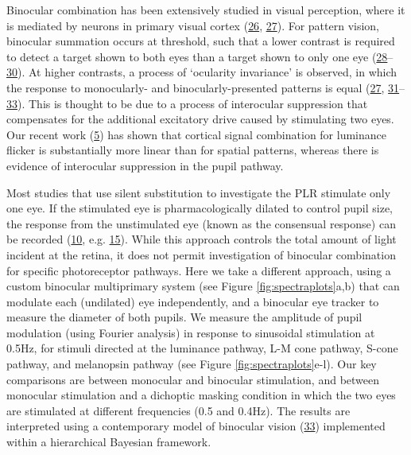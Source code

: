 \documentclass[
]{article}
\begin{document}
Binocular combination has been extensively studied in visual perception, where it is mediated by neurons in primary visual cortex (\protect\hyperlink{ref-Hubel1962}{26}, \protect\hyperlink{ref-Moradi2009}{27}). For pattern vision, binocular summation occurs at threshold, such that a lower contrast is required to detect a target shown to both eyes than a target shown to only one eye (\protect\hyperlink{ref-Baker2018}{28}--\protect\hyperlink{ref-Legge1984}{30}). At higher contrasts, a process of `ocularity invariance' is observed, in which the response to monocularly- and binocularly-presented patterns is equal (\protect\hyperlink{ref-Moradi2009}{27}, \protect\hyperlink{ref-Baker2007}{31}--\protect\hyperlink{ref-Meese2006}{33}). This is thought to be due to a process of interocular suppression that compensates for the additional excitatory drive caused by stimulating two eyes. Our recent work (\protect\hyperlink{ref-Segala2023}{5}) has shown that cortical signal combination for luminance flicker is substantially more linear than for spatial patterns, whereas there is evidence of interocular suppression in the pupil pathway.

Most studies that use silent substitution to investigate the PLR stimulate only one eye. If the stimulated eye is pharmacologically dilated to control pupil size, the response from the unstimulated eye (known as the consensual response) can be recorded (\protect\hyperlink{ref-Spitschan2014}{10}, e.g. \protect\hyperlink{ref-McDougal2010}{15}). While this approach controls the total amount of light incident at the retina, it does not permit investigation of binocular combination for specific photoreceptor pathways. Here we take a different approach, using a custom binocular multiprimary system (see Figure \ref{fig:spectraplots}a,b) that can modulate each (undilated) eye independently, and a binocular eye tracker to measure the diameter of both pupils. We measure the amplitude of pupil modulation (using Fourier analysis) in response to sinusoidal stimulation at 0.5Hz, for stimuli directed at the luminance pathway, L-M cone pathway, S-cone pathway, and melanopsin pathway (see Figure \ref{fig:spectraplots}e-l). Our key comparisons are between monocular and binocular stimulation, and between monocular stimulation and a dichoptic masking condition in which the two eyes are stimulated at different frequencies (0.5 and 0.4Hz). The results are interpreted using a contemporary model of binocular vision (\protect\hyperlink{ref-Meese2006}{33}) implemented within a hierarchical Bayesian framework.
\end{document}
